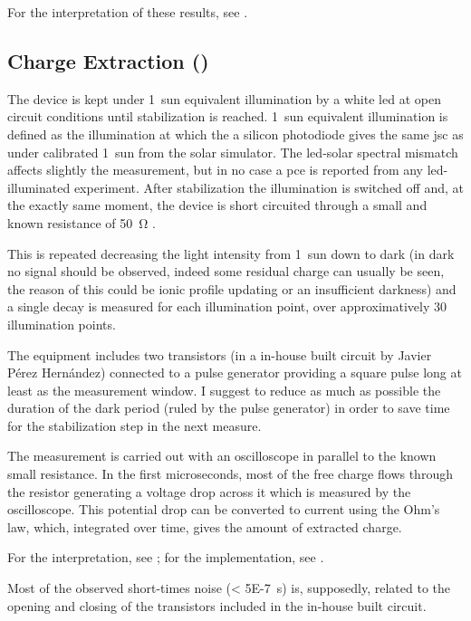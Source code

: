 		For the interpretation of these results, see .
		
	\subsection{Charge Extraction ()}

		The device is kept under 1~sun equivalent illumination by a white \gls{led} at open circuit conditions until stabilization is reached. 1~sun equivalent illumination is defined as the illumination at which the a silicon photodiode gives the same \gls{jsc} as under calibrated 1~sun from the solar simulator. The \gls{led}-solar spectral mismatch affects slightly the measurement, but in no case a \gls{pce} is reported from any \gls{led}-illuminated experiment. After stabilization the illumination is switched off and, at the exactly same moment, the device is short circuited through a small and known resistance of \SI{50}{\ohm} \cite{Duffy2000}.

		This is repeated decreasing the light intensity from 1~sun down to dark (in dark no signal should be observed, indeed some residual charge can usually be seen, the reason of this could be ionic profile updating or an insufficient darkness) and a single decay is measured for each illumination point, over approximatively 30 illumination points.

		The equipment includes two transistors (in a in-house built circuit by Javier Pérez Hernández) connected to a pulse generator providing a square pulse long at least as the measurement window. I suggest to reduce as much as possible the duration of the dark period (ruled by the pulse generator) in order to save time for the stabilization step in the next measure.

		The measurement is carried out with an oscilloscope in parallel to the known small resistance. In the first microseconds, most of the free charge flows through the resistor generating a voltage drop across it which is measured by the oscilloscope. This potential drop can be converted to current using the Ohm's law, which, integrated over time, gives the amount of extracted charge.

		For the interpretation, see ; for the implementation, see .

		\label{r_ce_noise}
			Most of the observed short-times noise (\SI{< 5E-7}{\s}) is, supposedly, related to the opening and closing of the transistors included in the in-house built circuit.

